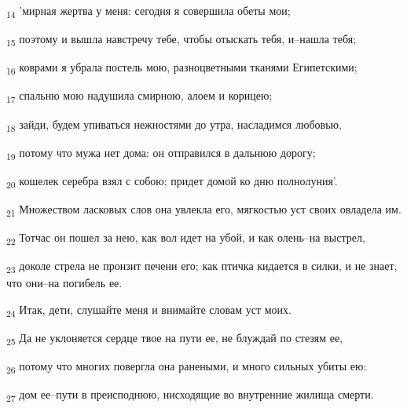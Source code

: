 \begin{tcolorbox}
\textsubscript{14} 'мирная жертва у меня: сегодня я совершила обеты мои;
\end{tcolorbox}
\begin{tcolorbox}
\textsubscript{15} поэтому и вышла навстречу тебе, чтобы отыскать тебя, и--нашла тебя;
\end{tcolorbox}
\begin{tcolorbox}
\textsubscript{16} коврами я убрала постель мою, разноцветными тканями Египетскими;
\end{tcolorbox}
\begin{tcolorbox}
\textsubscript{17} спальню мою надушила смирною, алоем и корицею;
\end{tcolorbox}
\begin{tcolorbox}
\textsubscript{18} зайди, будем упиваться нежностями до утра, насладимся любовью,
\end{tcolorbox}
\begin{tcolorbox}
\textsubscript{19} потому что мужа нет дома: он отправился в дальнюю дорогу;
\end{tcolorbox}
\begin{tcolorbox}
\textsubscript{20} кошелек серебра взял с собою; придет домой ко дню полнолуния'.
\end{tcolorbox}
\begin{tcolorbox}
\textsubscript{21} Множеством ласковых слов она увлекла его, мягкостью уст своих овладела им.
\end{tcolorbox}
\begin{tcolorbox}
\textsubscript{22} Тотчас он пошел за нею, как вол идет на убой, и как олень--на выстрел,
\end{tcolorbox}
\begin{tcolorbox}
\textsubscript{23} доколе стрела не пронзит печени его; как птичка кидается в силки, и не знает, что они--на погибель ее.
\end{tcolorbox}
\begin{tcolorbox}
\textsubscript{24} Итак, дети, слушайте меня и внимайте словам уст моих.
\end{tcolorbox}
\begin{tcolorbox}
\textsubscript{25} Да не уклоняется сердце твое на пути ее, не блуждай по стезям ее,
\end{tcolorbox}
\begin{tcolorbox}
\textsubscript{26} потому что многих повергла она ранеными, и много сильных убиты ею:
\end{tcolorbox}
\begin{tcolorbox}
\textsubscript{27} дом ее--пути в преисподнюю, нисходящие во внутренние жилища смерти.
\end{tcolorbox}
